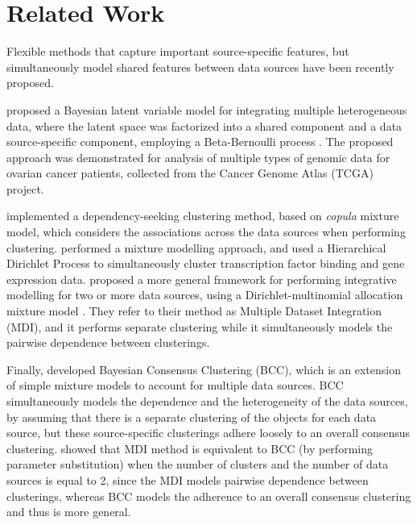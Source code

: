 \section{Related Work} \label{integr-related-work-sect}
Flexible methods that capture important source-specific features, but simultaneously model shared features between data sources have been recently proposed. 

\citet{Ray2012} proposed a Bayesian latent variable model for integrating multiple heterogeneous data, where the latent space was factorized into a shared component and a data source-specific component, employing a Beta-Bernoulli process \citep{Griffiths2005}. The proposed approach was demonstrated for analysis of multiple types of genomic data for ovarian cancer patients, collected from the Cancer Genome Atlas (TCGA) project.

\citet{Rey2012} implemented a dependency-seeking clustering method, based on \emph{copula} mixture model, which considers the associations across the data sources when performing clustering. \citet{Savage2010} performed a mixture modelling approach, and used a Hierarchical Dirichlet Process \citep{Ferguson1973, Escobar1995} to simultaneously cluster transcription factor binding and gene expression data. \citet{Kirk2012} proposed a more general framework for performing integrative modelling for two or more data sources, using a Dirichlet-multinomial allocation mixture model \citep{Green2001}. They refer to their method as Multiple Dataset Integration (MDI), and it performs separate clustering while it simultaneously models the pairwise dependence between clusterings. 

Finally, \citet{Lock2013} developed Bayesian Consensus Clustering (BCC), which is an extension of simple mixture models to account for multiple data sources. BCC simultaneously models the dependence and the heterogeneity of the data sources, by assuming that there is a separate clustering of the objects for each data source, but these source-specific clusterings adhere loosely to an overall consensus clustering. \citet{Lock2013} showed that MDI method is equivalent to BCC (by performing parameter substitution) when the number of clusters and the number of data sources is equal to 2, since the MDI models pairwise dependence between clusterings, whereas BCC models the adherence to an overall consensus clustering and thus is more general.